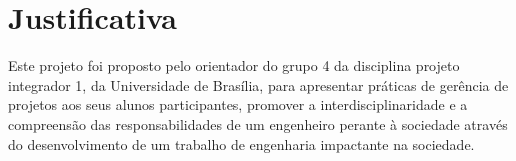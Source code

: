 \section{Justificativa}

Este projeto foi proposto pelo orientador do grupo 4 da disciplina
projeto integrador 1, da Universidade de Brasília, para
apresentar práticas de gerência de projetos aos seus alunos participantes,
 promover a interdisciplinaridade e a compreensão das
 responsabilidades de um engenheiro perante à sociedade através do desenvolvimento
 de um trabalho de engenharia impactante na sociedade.

